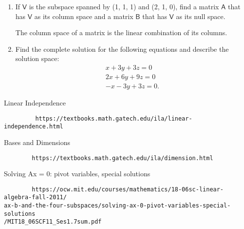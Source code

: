 \documentclass[a4paper, 11pt]{article}
\newcommand{\mat}[1]{\boldsymbol { \mathsf{#1}} }
\begin{document}
\begin{enumerate}
\item If $\mat V$ is the subspace spanned by (1, 1, 1) and (2, 1, 0), find a matrix $\mat A$ that has $\mat V$ as its column space and a matrix $\mat B$ that has $\mat V$ as its null space.

The column space of a matrix is the linear combination of its columns. 



\item Find the complete solution for the following equations and describe the solution space:
\begin{equation} \label{eq1}
\begin{split}
x + 3y + 3z  = 0\\
2x + 6y + 9z = 0\\
-x - 3y +3z  = 0.
\end{split}
\end{equation}
\end{enumerate}

\newpage 

\begin{thebibliography}{}
		Linear Independence 
		\begin{verbatim}
		 https://textbooks.math.gatech.edu/ila/linear-independence.html
		\end{verbatim}
		Bases and Dimensions
		\begin{verbatim}
		https://textbooks.math.gatech.edu/ila/dimension.html	
		\end{verbatim}
		Solving Ax = 0: pivot variables, special solutions
		\begin{verbatim}
		https://ocw.mit.edu/courses/mathematics/18-06sc-linear-algebra-fall-2011/
ax-b-and-the-four-subspaces/solving-ax-0-pivot-variables-special-solutions
/MIT18_06SCF11_Ses1.7sum.pdf
		\end{verbatim}

\end{thebibliography}
\end{document}
